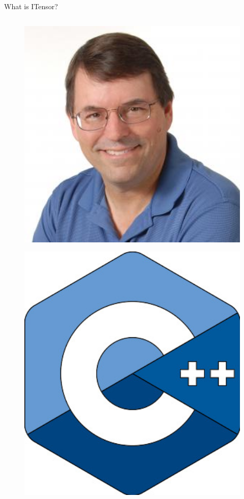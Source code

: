 \begin{frame}{What is ITensor?}
\begin{columns}
\begin{column}[T]{0.3\textwidth}
\begin{columns}
\begin{column}[T]{0.5\textwidth}
        \begin{figure}[T]
          \includegraphics[width=1.0\textwidth]{
            slides/assets/what-is-itensor-steve-white.jpg
          }
        \end{figure}

        \begin{figure}[T]
          \includegraphics[width=1.0\textwidth]{
            slides/assets/what-is-itensor-cpp.jpg
          }
        \end{figure}


\end{column}
\end{columns}
\end{column}
\end{columns}
\end{frame}
